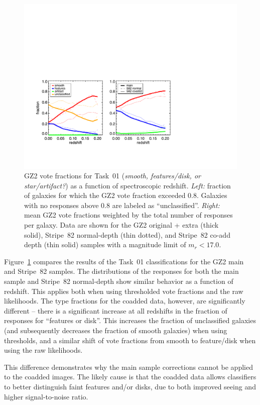 \documentclass[useAMS,usenatbib]{mn2e}
\begin{document}
\begin{figure}
\includegraphics[angle=0,width=7.0in]{figures/gz2_bias_demo_task01.pdf}
\caption{GZ2 vote fractions for Task~01 ({\it smooth, features/disk, or star/artifact?}) as a function of spectroscopic redshift. {\it Left:} fraction of galaxies for which the GZ2 vote fraction exceeded 0.8. Galaxies with no responses above 0.8 are labeled as ``unclassified''. {\it Right:} mean GZ2 vote fractions weighted by the total number of responses per galaxy. Data are shown for the GZ2 original + extra (thick solid), Stripe~82 normal-depth (thin dotted), and Stripe~82 co-add depth (thin solid) samples with a magnitude limit of $m_r < 17.0$.
\label{fig-task01}}
\end{figure}

Figure~\ref{fig-task01} compares the results of the Task~01 classifications for the GZ2 main and Stripe~82 samples. The distributions of the responses for both the main sample and Stripe~82 normal-depth show similar behavior as a function of redshift. This applies both when using thresholded vote fractions and the raw likelihoods. The type fractions for the coadded data, however, are significantly different -- there is a significant increase at all redshifts in the fraction of responses for ``features or disk''. This increases the fraction of unclassified galaxies (and subsequently decreases the fraction of smooth galaxies) when using thresholds, and a similar shift of vote fractions from smooth to feature/disk when using the raw likelihoods. 

This difference demonstrates why the main sample corrections cannot be applied to the coadded images. The likely cause is that the coadded data allows classifiers to better distinguish faint features and/or disks, due to both improved seeing \citep[from $1.4\arcsec$ to $1.1\arcsec$;][]{ann11} and higher signal-to-noise ratio.
\end{document}
